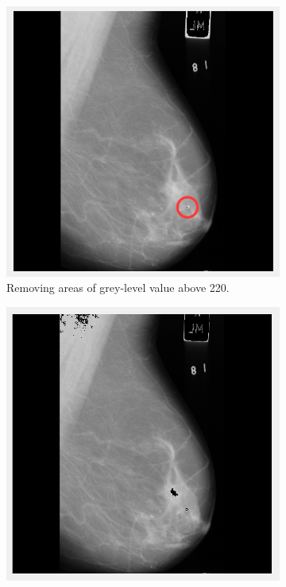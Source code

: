\begin{figure}[H]
    \begin{subfigure}[t]{0.3\textwidth}
      \includegraphics[width=\textwidth]{Chapter2/technical-img/remove-white-220.png}
      \caption{Removing areas of grey-level value above 220.}
      \label{fig:remove-white}
    \end{subfigure} \hfill
    \begin{subfigure}[t]{0.3\textwidth}
      \includegraphics[width=\textwidth]{Chapter2/technical-img/remove-white.png}

\end{subfigure}
\end{figure}
